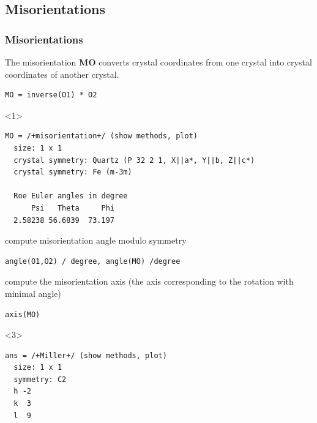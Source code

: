 \documentclass[compress]{beamer}
\begin{document}
\subsection*{Misorientations}
\label{sec:orientations2}

\begin{frame}[fragile]
  \frametitle{Misorientations}

  \begin{overlayarea}{\textwidth}{8cm}

  The \alert{misorientation} {\bf MO} converts crystal coordinates from one
  crystal into crystal coordinates of another crystal.

\begin{lstlisting}[style=input]
MO = inverse(O1) * O2
\end{lstlisting}

\begin{onlyenv}<1>
\vspace{-.3cm}\begin{lstlisting}[style=output]
MO = /+misorientation+/ (show methods, plot)
  size: 1 x 1
  crystal symmetry: Quartz (P 32 2 1, X||a*, Y||b, Z||c*)
  crystal symmetry: Fe (m-3m)

  Roe Euler angles in degree
      Psi   Theta     Phi
  2.58238 56.6839  73.197
\end{lstlisting}
\end{onlyenv}


  \pause
  \medskip

  compute misorientation angle modulo symmetry
\begin{lstlisting}[style=input]
angle(O1,O2) / degree, angle(MO) /degree
\end{lstlisting}

  \pause
  \medskip

  compute the misorientation axis (the axis corresponding to the rotation with
  minimal angle)
\begin{lstlisting}[style=input]
axis(MO)
\end{lstlisting}

  \begin{onlyenv}<3>
\vspace{-.3cm}
\begin{lstlisting}[style=output]
ans = /+Miller+/ (show methods, plot)
  size: 1 x 1
  symmetry: C2
  h -2
  k  3
  l  9
\end{lstlisting}
  \end{onlyenv}
  \end{overlayarea}

\end{frame}
\end{document}
